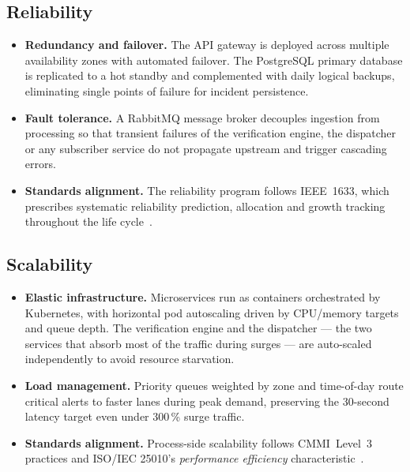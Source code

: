 \documentclass[conference,a4paper,10pt]{IEEEtran}
\begin{document}
\subsection{Reliability}
\begin{itemize}[leftmargin=*]
  \item \textbf{Redundancy and failover.} The API gateway is deployed across
  multiple availability zones with automated failover. The PostgreSQL primary
  database is replicated to a hot standby and complemented with daily logical
  backups, eliminating single points of failure for incident persistence.
  \item \textbf{Fault tolerance.} A RabbitMQ message broker decouples
  ingestion from processing so that transient failures of the verification
  engine, the dispatcher or any subscriber service do not propagate upstream
  and trigger cascading errors.
  \item \textbf{Standards alignment.} The reliability program follows
  IEEE~1633, which prescribes systematic reliability prediction, allocation
  and growth tracking throughout the life cycle~\cite{ieee1633}.
\end{itemize}

\subsection{Scalability}
\begin{itemize}[leftmargin=*]
  \item \textbf{Elastic infrastructure.} Microservices run as containers
  orchestrated by Kubernetes, with horizontal pod autoscaling driven by
  CPU/memory targets and queue depth. The verification engine and the
  dispatcher --- the two services that absorb most of the traffic during
  surges --- are auto-scaled independently to avoid resource starvation.
  \item \textbf{Load management.} Priority queues weighted by zone and
  time-of-day route critical alerts to faster lanes during peak demand,
  preserving the 30-second latency target even under 300\,\% surge traffic.
  \item \textbf{Standards alignment.} Process-side scalability follows
  CMMI~Level~3 practices and ISO/IEC 25010's \emph{performance
  efficiency} characteristic~\cite{cmmi,iso25010}.
\end{itemize}
\end{document}
